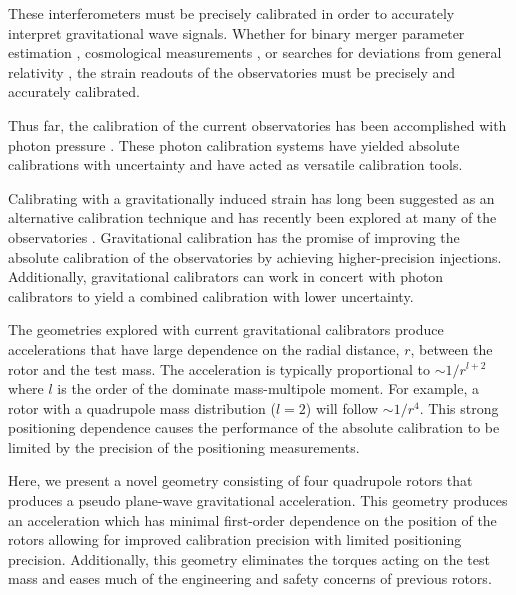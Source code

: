 \documentclass[superscriptaddress, twocolumn, prd]{revtex4-1}
\begin{document}
These interferometers must be precisely calibrated in order to accurately interpret gravitational wave signals. Whether for binary merger parameter estimation \cite{abbott2020population}, cosmological measurements \cite{abbott2021gravitational, ligo2017gravitational}, or searches for deviations from general relativity \cite{abbott2020tests}, the strain readouts of the observatories must be precisely and accurately calibrated.

Thus far, the calibration of the current observatories has been accomplished with photon pressure \cite{PCal}. These photon calibration systems have yielded absolute calibrations with  uncertainty and have acted as versatile calibration tools. 

Calibrating with a gravitationally induced strain has long been suggested as an alternative calibration technique \cite{hirakawa1980dynamical, kuroda1985experimental, mio1987experimental, astone1991evaluation, astone1998experimental, Matone_2007} and has recently been explored at many of the observatories \cite{Estevez_2018, estevez2021newtonian, PhysRevD.98.022005, ncal}. Gravitational calibration has the promise of improving the absolute calibration of the observatories by achieving higher-precision injections. Additionally, gravitational calibrators can work in concert with photon calibrators to yield a combined calibration with lower uncertainty.

The geometries explored with current gravitational calibrators \cite{Estevez_2018, estevez2021newtonian, PhysRevD.98.022005, ncal} produce accelerations that have large dependence on the radial distance, $r$, between the rotor and the test mass. The acceleration is typically proportional to $\sim1/r^{l+2}$ where $l$ is the order of the dominate mass-multipole moment. For example, a rotor with a quadrupole mass distribution ($l=2$) will follow $\sim1/r^4$. This strong positioning dependence causes the performance of the absolute calibration to be limited by the precision of the positioning measurements. 

Here, we present a novel geometry consisting of four quadrupole rotors that produces a pseudo plane-wave gravitational acceleration. This geometry produces an acceleration which has minimal first-order dependence on the position of the rotors allowing for improved calibration precision with limited positioning precision. Additionally, this geometry eliminates the torques acting on the test mass and eases much of the engineering and safety concerns of previous rotors.
\end{document}
